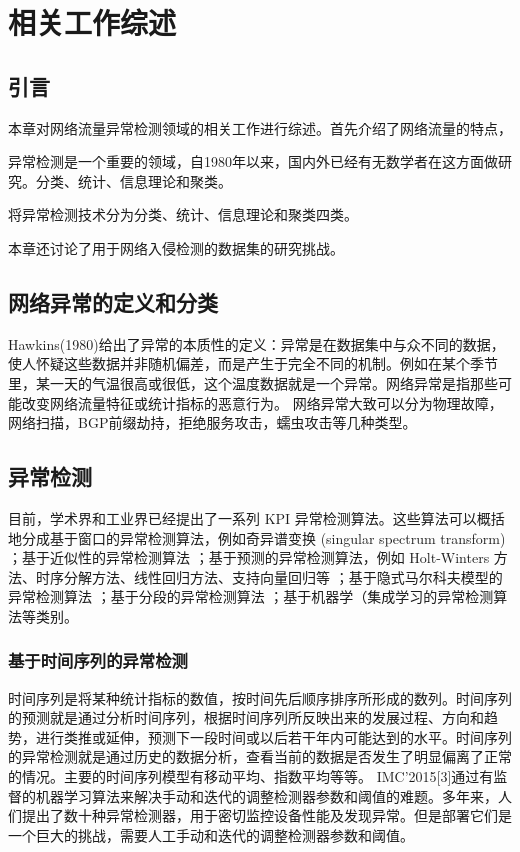 
\chapter{相关工作综述}

\section{引言}

本章对网络流量异常检测领域的相关工作进行综述。首先介绍了网络流量的特点，


异常检测是一个重要的领域，自1980年以来，国内外已经有无数学者在这方面做研究。分类、统计、信息理论和聚类。

\citet{ahmed2016survey}将异常检测技术分为分类、统计、信息理论和聚类四类。


本章还讨论了用于网络入侵检测的数据集的研究挑战。



\section{网络异常的定义和分类}
Hawkins(1980)给出了异常的本质性的定义\cite{hawkins1980identification}：异常是在数据集中与众不同的数据，使人怀疑这些数据并非随机偏差，而是产生于完全不同的机制。例如在某个季节里，某一天的气温很高或很低，这个温度数据就是一个异常。网络异常是指那些可能改变网络流量特征或统计指标的恶意行为。
网络异常大致可以分为物理故障，网络扫描，BGP前缀劫持，拒绝服务攻击，蠕虫攻击等几种类型。


\section{异常检测}
目前，学术界和工业界已经提出了一系列 KPI 异常检测算法。这些算法可以概括地分成基于窗口的异常检测算法，例如奇异谱变换 (singular spectrum transform) ；基于近似性的异常检测算法 ；基于预测的异常检测算法，例如 Holt-Winters 方法、时序分解方法、线性回归方法、支持向量回归等 ；基于隐式马尔科夫模型的异常检测算法 ；基于分段的异常检测算法 ；基于机器学（集成学习的异常检测算法等类别。

\subsection{基于时间序列的异常检测}
时间序列是将某种统计指标的数值，按时间先后顺序排序所形成的数列。时间序列的预测就是通过分析时间序列，根据时间序列所反映出来的发展过程、方向和趋势，进行类推或延伸，预测下一段时间或以后若干年内可能达到的水平。时间序列的异常检测就是通过历史的数据分析，查看当前的数据是否发生了明显偏离了正常的情况。主要的时间序列模型有移动平均、指数平均等等。
IMC’2015[3]通过有监督的机器学习算法来解决手动和迭代的调整检测器参数和阈值的难题。多年来，人们提出了数十种异常检测器，用于密切监控设备性能及发现异常。但是部署它们是一个巨大的挑战，需要人工手动和迭代的调整检测器参数和阈值。

